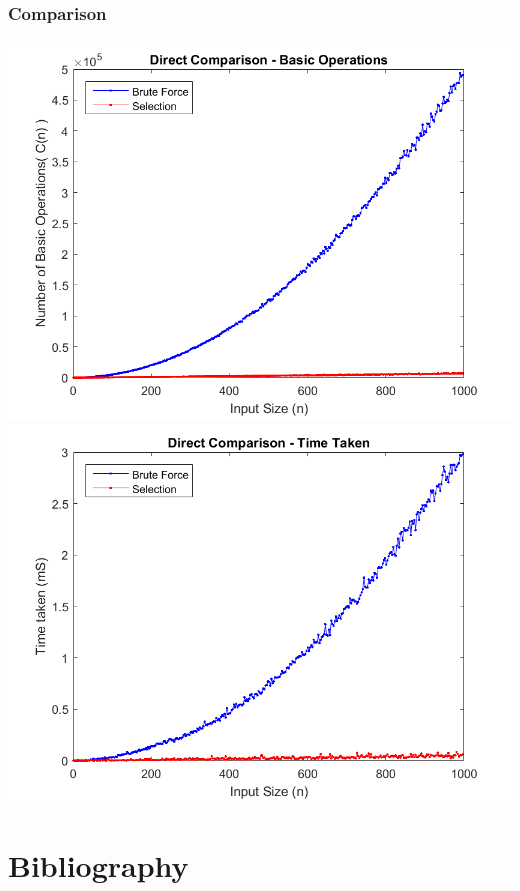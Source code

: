 \documentclass{article}
\begin{document}
        \subsubsection{Comparison}
            \includegraphics[scale=0.6]{Images/direct_comparison_basic_operations.png}\\
            \includegraphics[scale=0.6]{Images/direct_comparison_time_taken.png}

\section{Bibliography}
    
\end{document}
